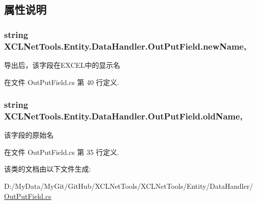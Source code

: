 \subsection{属性说明}
\hypertarget{class_x_c_l_net_tools_1_1_entity_1_1_data_handler_1_1_out_put_field_a1c47e24e0ff96b1a80e738c93a8c877d}{
\subsubsection[{new\-Name}]{\setlength{\rightskip}{0pt plus 5cm}string X\-C\-L\-Net\-Tools.\-Entity.\-Data\-Handler.\-Out\-Put\-Field.\-new\-Name\hspace{0.3cm}{\ttfamily [get]}, {\ttfamily [set]}}}\label{class_x_c_l_net_tools_1_1_entity_1_1_data_handler_1_1_out_put_field_a1c47e24e0ff96b1a80e738c93a8c877d}


导出后，该字段在\-E\-X\-C\-E\-L中的显示名 



在文件 Out\-Put\-Field.\-cs 第 40 行定义.

\hypertarget{class_x_c_l_net_tools_1_1_entity_1_1_data_handler_1_1_out_put_field_ad5c016e692d53fd511a7b0c8b4128f6d}{
\subsubsection[{old\-Name}]{\setlength{\rightskip}{0pt plus 5cm}string X\-C\-L\-Net\-Tools.\-Entity.\-Data\-Handler.\-Out\-Put\-Field.\-old\-Name\hspace{0.3cm}{\ttfamily [get]}, {\ttfamily [set]}}}\label{class_x_c_l_net_tools_1_1_entity_1_1_data_handler_1_1_out_put_field_ad5c016e692d53fd511a7b0c8b4128f6d}


该字段的原始名 



在文件 Out\-Put\-Field.\-cs 第 35 行定义.



该类的文档由以下文件生成\-:\begin{DoxyCompactItemize}
\item 
D\-:/\-My\-Data/\-My\-Git/\-Git\-Hub/\-X\-C\-L\-Net\-Tools/\-X\-C\-L\-Net\-Tools/\-Entity/\-Data\-Handler/\hyperlink{_out_put_field_8cs}{Out\-Put\-Field.\-cs}\end{DoxyCompactItemize}
